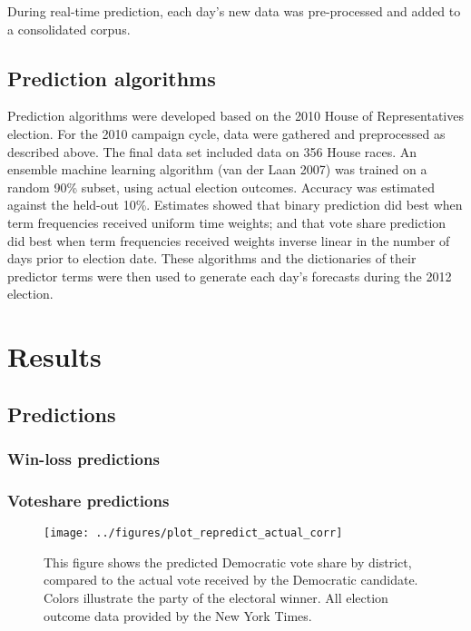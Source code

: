 \documentclass[11pt]{article}
\begin{document}
During real-time prediction, each day's new data was pre-processed and
added to a consolidated corpus. 

\subsection{Prediction algorithms}
\label{sec:pred-algor}

Prediction algorithms were developed based on the 2010 House of
Representatives election. For the 2010 campaign cycle, data were
gathered and preprocessed as described above. The final data set
included data on 356 House races. An ensemble machine learning
algorithm (van der Laan 2007) was trained on a random 90\% subset,
using actual election outcomes. Accuracy was estimated against the
held-out 10\%. Estimates showed that binary prediction did best when
term frequencies received uniform time weights; and that vote share
prediction did best when term frequencies received weights inverse
linear in the number of days prior to election date. These algorithms
and the dictionaries of their predictor terms were then used to
generate each day's forecasts during the 2012 election.



\section{Results}
\label{sec:results}


\subsection{Predictions}
\label{sec:predictions}


\subsubsection{Win-loss predictions}
\label{sec:win-loss-predictions}

\subsubsection{Voteshare predictions}
\label{sec:votesh-pred}

\begin{figure}[ht]
  \centering
  \texttt{[image: ../figures/plot\_repredict\_actual\_corr]}
  \caption{This figure shows the predicted Democratic vote share by district, compared to the actual vote received by the Democratic candidate. Colors illustrate the party of the electoral winner. All election outcome data provided by the New York Times.}
  \label{fig:predicted-actual-voteshare-bydistrict}
\end{figure}
\end{document}
